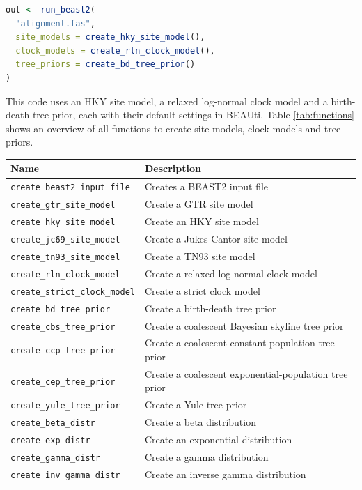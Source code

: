 \documentclass{article}
\begin{document}
\begin{lstlisting}[language=R, floatplacement=H]
out <- run_beast2(
  "alignment.fas",
  site_models = create_hky_site_model(),
  clock_models = create_rln_clock_model(),
  tree_priors = create_bd_tree_prior()
)
\end{lstlisting}

This code uses an HKY site model, a relaxed log-normal clock model and a 
birth-death tree prior, each with their default settings in BEAUti.
Table \ref{tab:functions} shows an overview of all functions to 
create site models, clock models and tree priors.

\begin{table}[]
\centering
\begin{tabular}{ | l | l | }
\hline
\textbf{Name} & \textbf{Description} \\
\hline
\verb;create_beast2_input_file; & Creates a BEAST2 input file \\
\hline
\verb;create_gtr_site_model; & Create a GTR site model \\
\verb;create_hky_site_model; & Create an HKY site model \\
\verb;create_jc69_site_model; & Create a Jukes-Cantor site model \\
\verb;create_tn93_site_model; & Create a TN93 site model \\
\hline
\verb;create_rln_clock_model; & Create a relaxed log-normal clock model \\
\verb;create_strict_clock_model; & Create a strict clock model \\
\hline
\verb;create_bd_tree_prior; & Create a birth-death tree prior \\
\verb;create_cbs_tree_prior; & Create a coalescent Bayesian skyline tree prior \\
\verb;create_ccp_tree_prior; & Create a coalescent constant-population tree prior \\
\verb;create_cep_tree_prior; & Create a coalescent exponential-population tree prior \\
\verb;create_yule_tree_prior; & Create a Yule tree prior \\
\hline
\verb;create_beta_distr; & Create a beta distribution \\
\verb;create_exp_distr; & Create an exponential distribution \\
\verb;create_gamma_distr; & Create a gamma distribution \\
\verb;create_inv_gamma_distr; & Create an inverse gamma distribution \\

\end{tabular}
\end{table}
\end{document}
